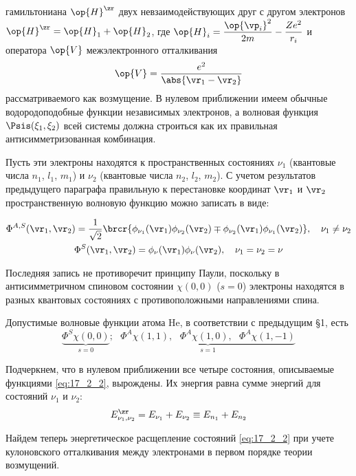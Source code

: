 гамильтониана $\op{H}^\zr$ двух невзаимодействующих друг с другом электронов $\op{H}^\zr = \op{H}_1 + \op{H}_2$, где $\op{H}_i = \dfrac{\op{\vp_i}^2}{2m} - \dfrac{Ze^2}{r_i}$ и оператора $\op{V}$ межэлектронного отталкивания
$$
\op{V} = \frac{e^2}{\abs{\vr_1 - \vr_2}}
$$
рассматриваемого как возмущение. В нулевом приближении имеем обычные водородоподобные функции независимых электронов, а волновая функция $\Psis(\xi_1, \xi_2)$ всей системы должна строиться как их правильная антисимметризованная комбинация.

Пусть эти электроны находятся к пространственных состояниях $\nu_1$ (квантовые числа $n_1$, $l_1$, $m_1$) и $\nu_2$ (квантовые числа $n_2$, $l_2$, $m_2$). С учетом результатов предыдущего параграфа правильную к перестановке координат $\vr_1$ и $\vr_2$ пространственную волновую функцию можно записать в виде:



\begin{gather}
\label{eq:17_2_1}
\Phi^{A, S}(\vr_1, \vr_2) = \frac{1}{\sqrt{2}}\brcr{\phi_{\nu_1}(\vr_1) \phi_{\nu_2}(\vr_2) \mp \phi_{\nu_2}(\vr_1) \phi_{\nu_1}(\vr_2)}, ~~~\nu_1 \neq \nu_2 \nonumber \\
\Phi^S(\vr_1, \vr_2) = \phi_{\nu}(\vr_1) \phi_{\nu}(\vr_2), ~~~\nu_1 = \nu_2= \nu
\end{gather}

Последняя запись не противоречит принципу Паули, поскольку в антисимметричном спиновом состоянии $\chi(0, 0)$ ($s=0$) электроны находятся в разных квантовых состояниях с противоположными направлениями спина.

Допустимые волновые функции атома He, в соответствии с предыдущим \S 1, есть
\begin{equation}
\label{eq:17_2_2}
\underbrace{\Phi^S \chi(0, 0)}_{s = 0};~~~\underbrace{\Phi^A \chi(1,1),~~~\Phi^A \chi(1,0),~~~\Phi^A \chi(1,-1)}_{s = 1}
\end{equation}

Подчеркнем, что в нулевом приближении все четыре состояния, описываемые функциями \eqref{eq:17_2_2}, вырождены. Их энергия равна сумме энергий для состояний $\nu_1$ и $\nu_2$:
$$
E_{\nu_1, \nu_2}^\zr = E_{\nu_1} + E_{\nu_2} \equiv E_{n_1} + E_{n_2}
$$

Найдем теперь энергетическое расщепление состояний \eqref{eq:17_2_2} при учете кулоновского отталкивания между электронами в первом порядке теории возмущений.

